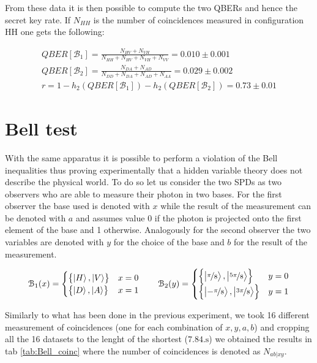 \documentclass[a4paper, 11pt]{article}
\begin{document}
      From these data it is then possible to compute the two QBERs and hence the secret key rate. If $N_{HH}$ is the number of coincidences measured in configuration HH one gets the following:

      \begin{gather*}
        QBER[\mathcal{B}_1] = \frac{N_{HV} + N_{VH}}{N_{HH} + N_{HV} + N_{VH} + N_{VV}} =  0.010 \pm 0.001 \\
        QBER[\mathcal{B}_2] = \frac{N_{DA} + N_{AD}}{N_{DD} + N_{DA} + N_{AD} + N_{AA}} = 0.029 \pm 0.002 \\
        r = 1 - h_2(QBER[\mathcal{B}_1]) - h_2(QBER[\mathcal{B}_2]) = 0.73 \pm 0.01
      \end{gather*}


  \section{Bell test}
    With the same apparatus it is possible to perform a violation of the Bell inequalities thus proving experimentally that a hidden variable theory does not describe the physical world. To do so let us consider the two SPDs as two observers who are able to measure their photon in two bases.
    For the first observer the base used is denoted with $x$ while the result of the measurement can be denoted with $a$ and assumes value 0 if the photon is projected onto the first element of the base and 1 otherwise. Analogously for the second observer the two variables are denoted with $y$ for the choice of the base and $b$ for the result of the measurement.

    \begin{gather*}
      \mathcal{B}_1(x) =
      \begin{cases}
        \left\{ \ket{H}, \ket{V} \right\} & x = 0 \\
        \left\{ \ket{D}, \ket{A} \right\} & x = 1
      \end{cases}
      \qquad
      \mathcal{B}_2(y) =
      \begin{cases}
        \left\{ \ket{\frac[f]{\pi}{8}}, \ket{\frac[f]{5\pi}{8}} \right\} & y = 0 \\
        \left\{ \ket{-\frac[f]{\pi}{8}}, \ket{\frac[f]{3\pi}{8}} \right\} & y = 1
      \end{cases}
    \end{gather*}

    Similarly to what has been done in the previous experiment, we took 16 different measurement of coincidences (one for each combination of $x,y,a,b$) and cropping all the 16 datasets to the lenght of the shortest ($7.84 \si{.\second}$) we obtained the results in tab \ref{tab:Bell_coinc} where the number of coincidences is denoted as $N_{ab|xy}$.
\end{document}
